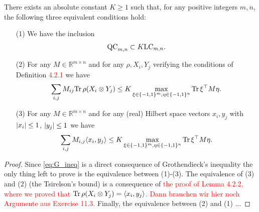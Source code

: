 \begin{theo}
	There exists an absolute constant $K\geq 1$ such that, for any positive integers $m,n$, the following three equivalent conditions hold:
	\begin{itemize}
		\item[(1)] We have the inclusion 
			\begin{equation}
				\textup{QC}_{m,n} \subset K\textup{LC}_{m,n}.
			\end{equation}
		\item[(2)] For any $M\in\mathbb{R}^{m\times n}$ and for any $\rho,X_i,Y_j$ verifying the conditions of Definition \textcolor{red}{4.2.1} we have
			\begin{equation}
				\sum_{i,j} M_{ij} \text{Tr} \, {\rho(X_i\otimes Y_j)} \leq K \max_{\xi\in\{-1,1\}^m,\eta\in\{-1,1\}^n} \text{Tr} \, {\xi^\top M \eta} .
			\end{equation}
			\item[(3)] For any $M\in\mathbb{R}^{m\times n}$ and for any (real) Hilbert space vectors $x_i,y_j$ with ${\left|{x_i}\right|}\leq 1$, ${\left|{y_j}\right|}\leq 1$ we have
				\begin{equation}
					\sum_{i,j} M_{i,j}\langle{x_i},{y_j}\rangle \leq K \max_{\xi\in\{-1,1\}^m,\eta\in\{-1,1\}^n} \text{Tr} \, {\xi^\top M \eta} . \label{eq:G_ineq}
				\end{equation}
	\end{itemize}
\end{theo}
\begin{proof}
	Since \eqref{eq:G_ineq} is a direct consequence of Grothendieck's inequality the only thing left to prove is the equivalence between (1)-(3). The equivalence of (3) and (2) (the Tsirelson's bound) is a consequence of \textcolor{red}{the proof of Lemma \textcolor{red}{4.2.2}, where we proved that $\text{Tr} \, {\rho(X_i\otimes Y_j)}  = \langle{x_i},{y_j}\rangle$.}
	\textcolor{red}{Dann brauchen wir hier noch Argumente aus Exercise 11.3.}
	Finally, the equivalence between (2) and (1) ...
\end{proof}
\newpage